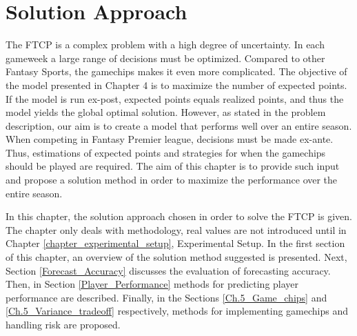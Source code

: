 

\chapter{Solution Approach} \label{chapter_solution_approach}

The FTCP is a complex problem with a high degree of uncertainty. In each gameweek a large range of decisions must be optimized. Compared to other Fantasy Sports, the gamechips makes it even more complicated. The objective of the model presented in Chapter 4 is to maximize the number of expected points. If the model is run ex-post, expected points equals realized points, and thus the model yields the global optimal solution. However, as stated in the problem description, our aim is to create a model that performs well over an entire season. When competing in Fantasy Premier league, decisions must be made ex-ante. Thus, estimations of expected points and strategies for when the gamechips should be played are required. The aim of this chapter is to provide such input and propose a solution method in order to maximize the performance over the entire season. 

\newpar

In this chapter, the solution approach chosen in order to solve the FTCP is given. The chapter only deals with methodology, real values are not introduced until in Chapter \ref{chapter_experimental_setup}, Experimental Setup. In the first section of this chapter, an overview of the solution method suggested is presented. Next, Section \ref{Forecast_Accuracy} discusses the evaluation of forecasting accuracy. Then, in Section \ref{Player_Performance} methods for predicting player performance are described. Finally, in the Sections \ref{Ch.5_Game_chips} and \ref{Ch.5_Variance_tradeoff} respectively, methods for implementing gamechips and handling risk are proposed.

